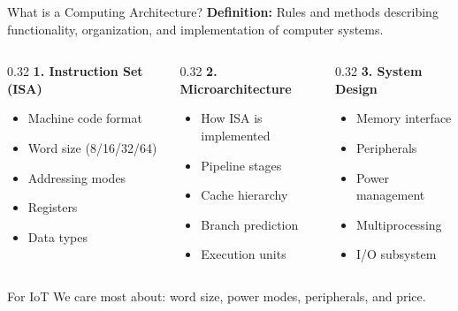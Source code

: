 \documentclass[aspectratio=169,11pt]{beamer}
\begin{document}
\begin{frame}{What is a Computing Architecture?}
    \textbf{Definition:} Rules and methods describing functionality, organization, and implementation of computer systems.
    
    \vspace{0.3cm}
    \begin{columns}[T]
        \begin{column}{0.32\textwidth}
            \textbf{1. Instruction Set (ISA)}
            \begin{itemize}
                \item Machine code format
                \item Word size (8/16/32/64)
                \item Addressing modes
                \item Registers
                \item Data types
            \end{itemize}
        \end{column}
        \begin{column}{0.32\textwidth}
            \textbf{2. Microarchitecture}
            \begin{itemize}
                \item How ISA is implemented
                \item Pipeline stages
                \item Cache hierarchy
                \item Branch prediction
                \item Execution units
            \end{itemize}
        \end{column}
        \begin{column}{0.32\textwidth}
            \textbf{3. System Design}
            \begin{itemize}
                \item Memory interface
                \item Peripherals
                \item Power management
                \item Multiprocessing
                \item I/O subsystem
            \end{itemize}
        \end{column}
    \end{columns}
    
    \vspace{0.3cm}
    \begin{block}{For IoT}
        We care most about: word size, power modes, peripherals, and price.
    \end{block}
\end{frame}
\end{document}
